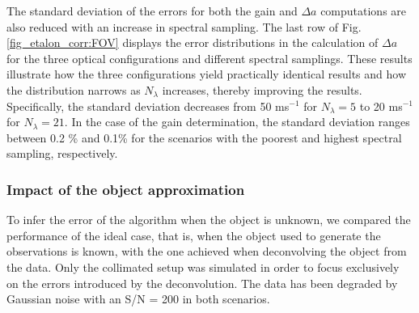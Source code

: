 The standard deviation of the errors for both the gain and $\Delta a$ computations are also reduced with an increase in spectral sampling. The last row of Fig. \ref{fig_etalon_corr:FOV} displays the error distributions in the calculation of  $\Delta a$ for the three optical configurations and different spectral samplings. These results illustrate how the three configurations yield practically identical results and how the distribution narrows as $N_\lambda$ increases, thereby improving the results. Specifically, the standard deviation decreases from 50 ms$^{-1}$ for $N_\lambda = 5$ to 20 ms$^{-1}$ for $N_\lambda = 21$. In the case of the gain determination, the standard deviation ranges between 0.2 \% and 0.1\% for the scenarios with the poorest and highest spectral sampling, respectively.

\subsubsection{\label{sect: fitting_deconv}Impact of the object approximation}

To infer the error of the algorithm when the object is unknown, we compared the performance of the ideal case, that is, when the object used to generate the observations is known, with the one achieved when deconvolving the object from the data. Only the collimated setup was simulated in order to focus exclusively on the errors introduced by the deconvolution. The data has been degraded by Gaussian noise with an S/N = 200 in both scenarios. 

